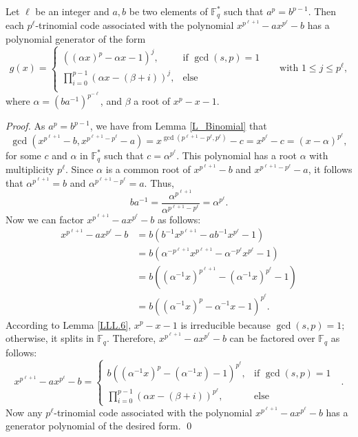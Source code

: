 \documentclass[12pt]{elsarticle}
\def\dprod #1#2{\displaystyle{\prod_{#1}^{#2}}}
\theoremstyle{break}
{\theorembodyfont{\upshape}
    \newtheorem{theorem}{Theorem}[section] %
    \newtheorem{lemma}[theorem]{Lemma} %
    \newtheorem{proposition}[theorem]{Proposition}
    \newtheorem{corollary}[theorem]{Corollary}
    \newtheorem{definition}[theorem]{Definition}
    \newtheorem{example}[theorem]{Example}
    \newtheorem{remark}[theorem]{Remark}
    \newtheorem{conjecture}[theorem]{Conjecture}
    \newtheorem*{proof}{{Proof}}
	\newtheorem*{notation}{Notation}
	\newtheorem*{main}{Cain Theorem}
	\newtheorem*{problem}{Problem}
}
\begin{document}
\begin{theorem}\label{Th.4}
Let $\ell$ be an integer and  $a, b$ be two elements of $\mathbb{F}_q^*$ such that $a^{p} = b^{p-1}$. Then each  $p^{\ell}$-trinomial code  associated with the polynomial $x^{p^{\ell+1}} - a x^{p^{\ell}} - b$ has a polynomial generator of the form 
$$
g(x) =   \begin{cases}
 \left((\alpha x)^{p}- \alpha x-1 \right)^{j} , & \text{if $\gcd(s,p)=1$ }\\
\dprod{i=0}{p-1} ( \alpha x-(\beta+i))^{j}, & \text{else }\\
  \end{cases} 
  \quad \text{with } 1 \leq j \leq p^{\ell},
$$
where 
$\alpha = (b a^{-1})^{p^{-\ell}}$, and $\beta$ a root of $ x^p-x-1.$


\end{theorem}
\begin{proof}
 As $a^{p} = b^{p-1}$, we have from Lemma \ref{L_Binomial} that
 $$\gcd(x^{p^{\ell+1} } - b, x^{p^{\ell+1} - p^{\ell}} - a) = x^{\gcd(p^{\ell+1} - p^{\ell}, p^{\ell})} - c = x^{p^{\ell}} - c = (x - \alpha)^{p^{\ell}},$$ for some $c$ and $\alpha$ in $\mathbb{F}_q^*$ such that $c = \alpha^{p^{\ell}}$. This polynomial has a root $\alpha$ with multiplicity $p^{\ell}$. Since $\alpha$ is a common root of $x^{p^{\ell+1}} - b$ and $x^{p^{\ell+1} - p^{\ell}} - a$, it follows that $\alpha^{p^{\ell+1}} = b$ and $\alpha^{p^{\ell+1} - p^{\ell}} = a$. Thus,
$$
b a^{-1} = \frac{\alpha^{p^{\ell+1}}}{\alpha^{p^{\ell+1} - p^{\ell}}} = \alpha^{p^{\ell}}.
$$
Now we can factor $x^{p^{\ell+1}} - a x^{p^{\ell}} - b$ as follows:
$$
\begin{array}{rl}
x^{p^{\ell+1}} - a x^{p^{\ell}} - b &= b \left( b^{-1} x^{p^{\ell+1}} - ab^{-1} x^{p^{\ell}} - 1 \right) \\
&= b \left( \alpha^{-p^{\ell+1}} x^{p^{\ell+1}} - \alpha^{-p^{\ell}} x^{p^{\ell}} - 1 \right) \\
&= b \left( (\alpha^{-1} x)^{p^{\ell+1}} - (\alpha^{-1} x)^{p^{\ell}} - 1 \right) \\
&= b \left( (\alpha^{-1} x)^p - \alpha^{-1} x - 1 \right)^{p^{\ell}}.
\end{array}
$$
According to Lemma \ref{LLL.6}, $x^p - x - 1$ is irreducible because $\gcd(s, p) = 1; $ otherwise, it splits in $\mathbb{F}_q$. Therefore, $x^{p^{\ell+1}} - a x^{p^{\ell}} - b$ can be factored over $\mathbb{F}_q$ as follows:
$$
x^{p^{\ell+1}} - a x^{p^{\ell}} - b = 
\begin{cases}
b \left( (\alpha^{-1} x)^p - (\alpha^{-1} x) - 1 \right)^{p^{\ell}},  & \text{if $\gcd(s,p)=1$ }\\
\dprod{i=0}{p-1} ( \alpha x-(\beta+i))^{p^{\ell}}, & \text{else }
\end{cases}.
$$
Now any $p^{\ell}$-trinomial code associated with the polynomial $x^{p^{\ell+1}} - a x^{p^{\ell}} - b$ has a generator polynomial of the  desired form.
\qed 
\end{proof}
   
\end{document}
